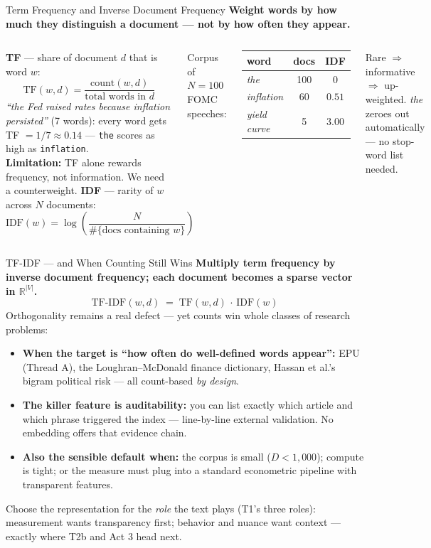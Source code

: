 \begin{frame}{Term Frequency and Inverse Document Frequency}
\textbf{Weight words by how much they distinguish a document --- not by how often they appear.}
\begin{columns}[T]
\textbf{TF} --- share of document $d$ that is word $w$:
\[ \mathrm{TF}(w,d) = \frac{\mathrm{count}(w,d)}{\text{total words in } d} \]
{\footnotesize \emph{``the Fed raised rates because inflation persisted''} (7 words): every word gets TF $=1/7\approx 0.14$ --- \texttt{the} scores as high as \texttt{inflation}.\\[3pt]
\textbf{Limitation:} TF alone rewards frequency, not information. We need a counterweight.}
\textbf{IDF} --- rarity of $w$ across $N$ documents:
\[ \mathrm{IDF}(w) = \log\!\left(\frac{N}{\#\{\text{docs containing } w\}}\right) \]
{\footnotesize Corpus of $N=100$ FOMC speeches:
\begin{center}
\begin{tabular}{l c c}
\toprule
word & docs & IDF \\
\midrule
\emph{the} & 100 & $0$ \\
\emph{inflation} & 60 & $0.51$ \\
\emph{yield curve} & 5 & $3.00$ \\
\bottomrule
\end{tabular}
\end{center}
Rare $\Rightarrow$ informative $\Rightarrow$ up-weighted. \emph{the} zeroes out automatically --- no stop-word list needed.}
\end{columns}
\end{frame}

\begin{frame}{TF-IDF --- and When Counting Still Wins}
\textbf{Multiply term frequency by inverse document frequency; each document becomes a sparse vector in $\mathbb{R}^{|V|}$.}
\[
   \text{TF-IDF}(w, d) \;=\; \text{TF}(w, d)\,\cdot\,\text{IDF}(w)
\]
\smallskip
Orthogonality remains a real defect --- yet counts win whole classes of research problems:
\begin{itemize}
\item \textbf{When the target is ``how often do well-defined words appear'':} EPU (Thread A), the Loughran--McDonald finance dictionary, Hassan et al.'s bigram political risk --- all count-based \emph{by design}.
\item \textbf{The killer feature is auditability:} you can list exactly which article and which phrase triggered the index --- line-by-line external validation. No embedding offers that evidence chain.
\item \textbf{Also the sensible default when:} the corpus is small ($D < 1{,}000$); compute is tight; or the measure must plug into a standard econometric pipeline with transparent features.
\end{itemize}
\smallskip
\begin{takeawaybox}
Choose the representation for the \emph{role} the text plays (T1's three roles): measurement wants transparency first; behavior and nuance want context --- exactly where T2b and Act 3 head next.
\end{takeawaybox}
\end{frame}

